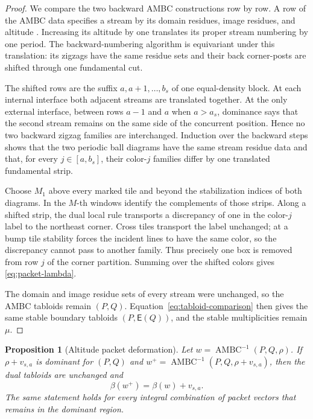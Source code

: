 \documentclass[11pt]{article}
\newtheorem{proposition}[theorem]{Proposition}
\theoremstyle{definition}
\theoremstyle{remark}
\newcommand{\AMBC}{\operatorname{AMBC}}
\newcommand{\E}{\mathsf E}
\begin{document}
\begin{proof}
We compare the two backward AMBC constructions row by row.  A row of the AMBC data
specifies a stream by its domain residues, image residues, and altitude
\cite[Definitions~3.20--3.25]{CPY18}.  Increasing its altitude by one translates its
proper stream numbering by one period.  The backward-numbering algorithm is equivariant
under this translation: its zigzags have the same residue sets and their back
corner-posts are shifted through one fundamental cut.

The shifted rows are the suffix \(a,a+1,\ldots,b_s\) of one equal-density block.  At
each internal interface both adjacent streams are translated together.  At the only
external interface, between rows \(a-1\) and \(a\) when \(a>a_s\), dominance says that
the second stream remains on the same side of the concurrent position.  Hence no two
backward zigzag families are interchanged.  Induction over the backward steps shows that
the two periodic ball diagrams have the same stream residue data and that, for every
\(j\in[a,b_s]\), their color-\(j\) families differ by one translated fundamental strip.

Choose \(M_1\) above every marked tile and beyond the stabilization indices of both
diagrams.  In the \(M\)-th windows identify the complements of those strips.  Along a
shifted strip, the dual local rule transports a discrepancy of one in the color-\(j\)
label to the northeast corner.  Cross tiles transport the label unchanged; at a bump
tile stability forces the incident lines to have the same color, so the discrepancy
cannot pass to another family.  Thus precisely one box is removed from row \(j\) of the
corner partition.  Summing over the shifted colors gives \eqref{eq:packet-lambda}.

The domain and image residue sets of every stream were unchanged, so the AMBC tabloids
remain \((P,Q)\).  Equation~\eqref{eq:tabloid-comparison} then gives the same stable
boundary tabloids \((P,\E(Q))\), and the stable multiplicities remain \(\mu\).
\end{proof}

\begin{proposition}[Altitude packet deformation]\label{prop:altitude}
Let \(w=\AMBC^{-1}(P,Q,\rho)\).  If \(\rho+v_{s,a}\) is dominant for \((P,Q)\) and
\(w^+=\AMBC^{-1}(P,Q,\rho+v_{s,a})\), then the dual tabloids are unchanged and
\begin{equation}\label{eq:beta-packet}
                         \beta(w^+)=\beta(w)+v_{s,a}.
\end{equation}
The same statement holds for every integral combination of packet vectors that remains
in the dominant region.
\end{proposition}
\end{document}
